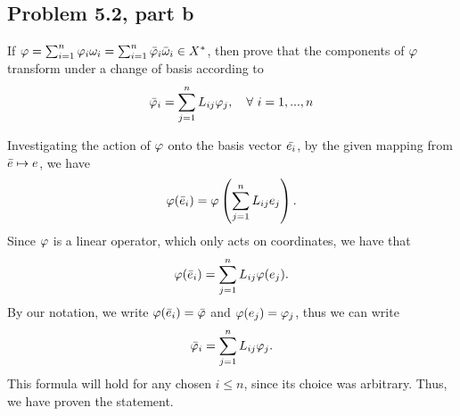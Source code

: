 \newpage
\subsection{Problem 5.2, part b}
If $\varphi = \sum_{i = 1}^n \varphi_i \omega_i = \sum_{i = 1}^n \Bar{\varphi}_i \Bar{\omega}_i \in X^{*}$, then prove that the components of $\varphi$ transform under a change of basis according to
\[\Bar{\varphi}_i = \sum_{j  =1}^n L_{ij}\varphi_j, \quad \forall \ i = 1, ..., n\]
\partbreak
\begin{solution}

    Investigating the action of $\varphi$ onto the basis vector $\Bar{e_i}$, by the given mapping from $\Bar{e} \mapsto e$, we have 
    \[\varphi(\Bar{e}_i) = \varphi \left( \sum_{j = 1}^n L_{ij} e_j\right).\]
    Since $\varphi$ is a linear operator, which only acts on coordinates, we have that 
    \[\varphi(\Bar{e}_i) = \sum_{j = 1}^n L_{ij} \varphi (e_j).\]
    By our notation, we write $\varphi(\Bar{e}_i) = \Bar{\varphi}$ and $\varphi (e_j) = \varphi_j$, thus we can write
    \[\Bar{\varphi}_i = \sum_{j = 1}^n L_{ij} \varphi_j.\]
    This formula will hold for any chosen $i \leq n$, since its choice was arbitrary. Thus, we have proven the statement. 
\end{solution}

\newpage
